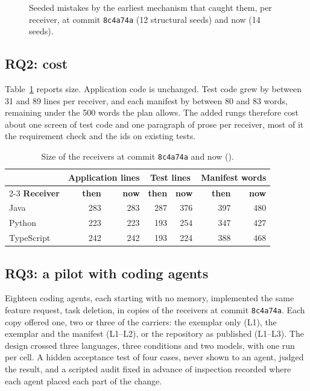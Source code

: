 \begin{figure}[t]
  \centering
  
  \caption{Seeded mistakes by the earliest mechanism that caught them, per receiver, at commit
  \texttt{8c4a74a} (12 structural seeds) and now (14 seeds).}
  \label{fig:seeding}
\end{figure}

\subsection{RQ2: cost}

Table~\ref{tab:size} reports size. Application code is unchanged. Test code grew by between 31
and 89 lines per receiver, and each manifest by between 80 and 83 words, remaining under the 500
words the plan allows. The added rungs therefore cost about one screen of test code and one
paragraph of prose per receiver, most of it the requirement check and the ids on existing tests.

\begin{table}[t]
  \centering\small
  \caption{Size of the receivers at commit \texttt{8c4a74a} and now ().}
  \label{tab:size}
  \begin{tabular}{l|r|r|r|r|r|r}
    \hline
    \multicolumn{1}{l|}{} & \multicolumn{2}{c|}{\textbf{Application lines}} & \multicolumn{2}{c|}{\textbf{Test lines}} & \multicolumn{2}{c}{\textbf{Manifest words}} \\
    \cline{2-3}\cline{4-5}\cline{6-7}
    \textbf{Receiver} & \textbf{then} & \textbf{now} & \textbf{then} & \textbf{now} & \textbf{then} & \textbf{now} \\
    \hline\hline
    Java       & 283 & 283 & 287 & 376 & 397 & 480 \\
    \hline
    Python     & 223 & 223 & 193 & 254 & 347 & 427 \\
    \hline
    TypeScript & 242 & 242 & 193 & 224 & 388 & 468 \\
    \hline
  \end{tabular}
\end{table}

\subsection{RQ3: a pilot with coding agents}

Eighteen coding agents, each starting with no memory, implemented the same feature request, task
deletion, in copies of the receivers at commit \texttt{8c4a74a}. Each copy offered one, two or
three of the carriers: the exemplar only (L1), the exemplar and the manifest (L1--L2), or the
repository as published (L1--L3). The design crossed three languages, three conditions and two
models, with one run per cell. A hidden acceptance test of four cases, never shown to an agent,
judged the result, and a scripted audit fixed in advance of inspection recorded where each agent
placed each part of the change.


